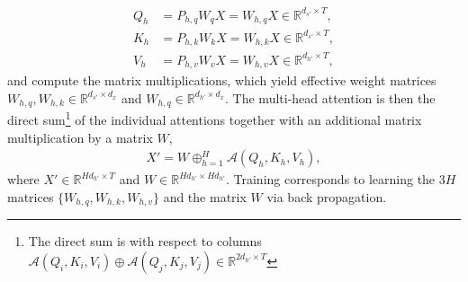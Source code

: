 \documentclass[12pt,a4paper]{article}
\begin{document}
\begin{align}
Q_h &= P_{h,q} W_q X = W_{h,q}  X \in \mathbb{R} ^ {d_{s'} \times T}, \\ 
K_h &= P_{h,k} W_k X = W_{h,k}  X \in \mathbb{R} ^ {d_{s'}  \times T},\\ 
V_h &= P_{h,v} W_vX  = W_{h,v}  X \in \mathbb{R} ^ {d_{h'}  \times T},
\end{align}
and compute the matrix multiplications, which yield effective weight matrices $W_{h,q}, W_{h,k} \in \mathbb{R} ^ {d_{s'} \times d_x}$ and $W_{h,q} \in \mathbb{R} ^ {d_{h'} \times d_x}$.      
The multi-head attention is then the direct sum\footnote{The direct sum is with respect to columns $\mathcal A(Q_i, K_i, V_i)\oplus \mathcal A(Q_j, K_j, V_j) \in \mathbb{R} ^ {2d_{h'}  \times T }$} of the individual attentions together with an additional matrix multiplication by a matrix $W$, 
\begin{align}
	 X' = W\oplus_{h=1}^H \mathcal A(Q_h, K_h, V_h),
\end{align}
where $X' \in \mathbb{R} ^ {H d_{h'}  \times T}$ and $W \in \mathbb{R} ^ {H d_{h'}  \times H d_{h'}}$.
Training corresponds to learning the 3$H$ matrices $\{W_{h,q}, W_{h,k}, W_{h,v}\}$ and the matrix $W$ via back propagation.
\end{document}
